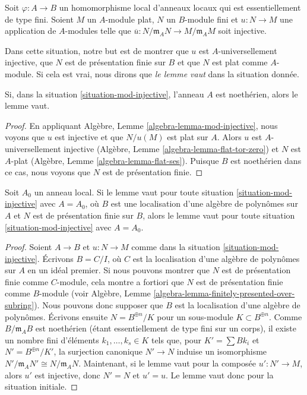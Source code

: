 \begin{situation}
\label{situation-mod-injective}
Soit $\varphi : A \to B$ un homomorphisme local d'anneaux locaux
qui est essentiellement de type fini. Soient $M$ un $A$-module plat,
$N$ un $B$-module fini et $u : N \to M$ une application de $A$-modules telle que
$\overline{u} : N/\mathfrak m_AN \to M/\mathfrak m_AM$ soit injective.
\end{situation}

\noindent
Dans cette situation, notre but est de montrer que $u$ est $A$-universellement injective,
que $N$ est de présentation finie sur $B$ et que $N$ est plat comme $A$-module.
Si cela est vrai, nous dirons que {\it le lemme vaut} dans la situation donnée.

\begin{lemma}
\label{lemma-Noetherian-finite-type-injective-into-flat-mod-m}
Si, dans la situation \ref{situation-mod-injective}, l'anneau $A$ est noethérien,
alors le lemme vaut.
\end{lemma}

\begin{proof}
En appliquant Algèbre, Lemme \ref{algebra-lemma-mod-injective}, nous voyons que
$u$ est injective et que $N/u(M)$ est plat sur $A$. Alors $u$ est
$A$-universellement injective
(Algèbre, Lemme \ref{algebra-lemma-flat-tor-zero}) et $N$ est $A$-plat
(Algèbre, Lemme \ref{algebra-lemma-flat-ses}). Puisque $B$ est noethérien
dans ce cas, nous voyons que $N$ est de présentation finie.
\end{proof}

\begin{lemma}
\label{lemma-reduce-finite-type-injective-into-flat-mod-m}
Soit $A_0$ un anneau local. Si le lemme vaut pour toute
situation \ref{situation-mod-injective} avec $A = A_0$, où $B$ est une
localisation d'une algèbre de polynômes sur $A$ et $N$ est de présentation finie
sur $B$, alors le lemme vaut pour toute
situation \ref{situation-mod-injective} avec $A = A_0$.
\end{lemma}

\begin{proof}
Soient $A \to B$ et $u : N \to M$ comme dans la situation \ref{situation-mod-injective}.
Écrivons $B = C/I$, où $C$ est la localisation d'une algèbre de polynômes
sur $A$ en un idéal premier. Si nous pouvons montrer que $N$ est de présentation finie comme
$C$-module, cela montre a fortiori que $N$ est de présentation finie
comme $B$-module (voir
Algèbre, Lemme \ref{algebra-lemma-finitely-presented-over-subring}).
Nous pouvons donc supposer que $B$ est la localisation d'une algèbre de polynômes.
Écrivons ensuite $N = B^{\oplus n}/K$ pour un sous-module $K \subset B^{\oplus n}$.
Comme $B/\mathfrak m_AB$ est noethérien (étant essentiellement de type fini
sur un corps), il existe un nombre fini d'éléments $k_1, \ldots, k_s \in K$
tels que, pour $K' = \sum Bk_i$ et $N' = B^{\oplus n}/K'$, la
surjection canonique $N' \to N$ induise un isomorphisme
$N'/\mathfrak m_AN' \cong N/\mathfrak m_AN$.
Maintenant, si le lemme vaut pour la composée $u' : N' \to M$,
alors $u'$ est injective, donc $N' = N$ et $u' = u$. Le lemme vaut donc pour
la situation initiale.
\end{proof}

